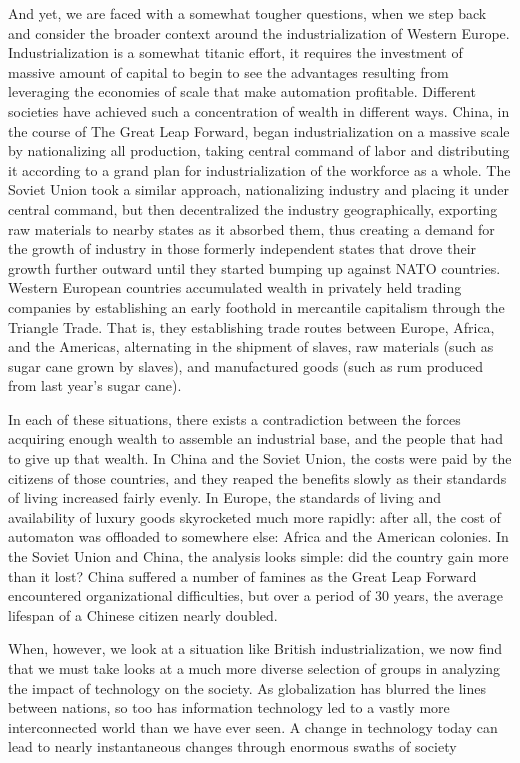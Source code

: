 And yet, we are faced with a somewhat tougher questions, when we step 
back and consider the broader context around the industrialization of 
Western Europe.  Industrialization is a somewhat titanic effort, it 
requires the investment of massive amount of capital to begin to see 
the advantages resulting from leveraging the economies of scale that 
make automation profitable.  Different societies have achieved such 
a concentration of wealth in different ways.  China, in the course of 
The Great Leap Forward, began industrialization on a massive scale by 
nationalizing all production, taking central command of labor and 
distributing it according to a grand plan for industrialization of the 
workforce as a whole.  The Soviet Union took a similar approach, 
nationalizing industry and placing it under central command, but then 
decentralized the industry geographically, exporting raw materials to 
nearby states as it absorbed them, thus creating a demand for the 
growth of industry in those formerly independent states that drove 
their growth further outward until they started bumping up against 
NATO countries.  Western European countries accumulated wealth in 
privately held trading companies by establishing an early foothold 
in mercantile capitalism through the Triangle Trade. That is, they 
establishing trade routes between Europe, Africa, and the Americas, 
alternating in the shipment of slaves, raw materials (such as sugar 
cane grown by slaves), and manufactured goods (such as rum produced 
from last year's sugar cane).  

In each of these situations, there exists a contradiction 
between the forces acquiring enough wealth to assemble an industrial 
base, and the people that had to give up that wealth.  In China and 
the Soviet Union, the costs were paid by the citizens of those 
countries, and they reaped the benefits slowly as their standards of 
living increased fairly evenly.  In Europe, the standards of living 
and availability of luxury goods skyrocketed much more rapidly: after 
all, the cost of automaton was offloaded to somewhere else: Africa and 
the American colonies.  In the Soviet Union and China, the analysis looks 
simple: did the country gain more than it lost?  China suffered a number 
of famines as the Great Leap Forward encountered organizational 
difficulties, but over a period of 30 years, the average lifespan of a 
Chinese citizen nearly doubled.  

When, however, we look at a situation like British industrialization, 
we now find that we must take looks at a much more diverse selection 
of groups in analyzing the impact of technology on the society.  As 
globalization has blurred the lines between nations, so too has 
information technology led to a vastly more interconnected world than 
we have ever seen.  A change in technology today can lead to nearly 
instantaneous changes through enormous swaths of society

